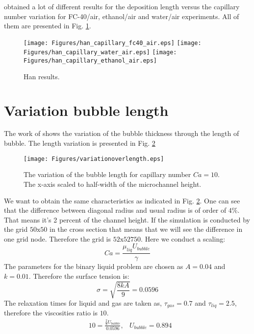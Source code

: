 \documentclass{article}
\begin{document}
\citet{shikazono-square} obtained a lot of different results for the deposition length versus the
capillary number variation for FC-40/air, ethanol/air and water/air experiments. All of them are
presented in Fig. \ref{fig:deposition:han}.
\begin{figure}
\texttt{[image: Figures/han\_capillary\_fc40\_air.eps]}\hfill
\texttt{[image: Figures/han\_capillary\_water\_air.eps]}\hfill
\texttt{[image: Figures/han\_capillary\_ethanol\_air.eps]}\\
\caption{Han results. \label{fig:deposition:han}}
\end{figure}

\section{Variation bubble length}
The work of \cite{heil-threedim} shows the variation of the bubble thickness through the length of
bubble. The length variation is presented in Fig. \ref{fig:thickness:variation:ca:ten}
\begin{figure}
\texttt{[image: Figures/variationoverlength.eps]}
\caption{The variation of the bubble length for capillary number $Ca=10$. The x-axis scaled to
half-width of the microchannel height.  \label{fig:thickness:variation:ca:ten}}
\end{figure}
We want to obtain the same characteristics as indicated in Fig.
\ref{fig:thickness:variation:ca:ten}. One can see that the difference between diagonal radius and
usual radius is of order of $4\%$. That means it's 2 percent of the channel height. If the
simulation is conducted by the grid $50\mathrm{x}50$ in the cross section that means that we will
see the difference in one grid node. Therefore the grid is $52\mathrm{x}52\mathrm{750}$. Here we
conduct a scaling:
\begin{equation}
Ca=\frac{\mu_{liq} U_{bubble}}{\gamma}
\end{equation}
The parameters for the binary liquid problem are chosen as $A=0.04$ and $k=0.01$. Therefore the
surface tension is:
\begin{equation}
\sigma = \sqrt{\frac{8 k A}{9}}=0.0596
\end{equation}
The relaxation times for liquid and gas are taken as, $\tau_{gas}=0.7$ and $\tau_{liq}=2.5$,
therefore the viscosities ratio is $10$.
\begin{equation}
\begin{aligned}
&10=\frac{\frac{2}{3} U_{bubble}}{0.0596},
&U_{bubble}=0.894
\end{aligned}
\end{equation}
\end{document}

